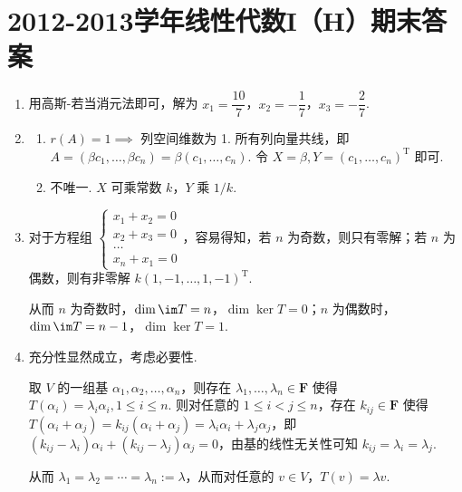 \section{2012-2013学年线性代数I（H）期末答案}

\begin{enumerate}
    \item 用高斯-若当消元法即可，解为 $x_1=\dfrac{10}{7}$，$x_2=-\dfrac{1}{7}$，$x_3=-\dfrac{2}{7}$.

    \item
    \begin{enumerate}
        \item $r(A)=1 \implies$ 列空间维数为 1. 所有列向量共线，即 $A = (\beta c_1, \dots, \beta c_n) = \beta (c_1, \dots, c_n)$. 令 $X=\beta, Y=(c_1, \dots, c_n)^\mathrm{T}$ 即可.
        \item 不唯一. $X$ 可乘常数 $k$，$Y$ 乘 $1/k$.
    \end{enumerate}

    \item 对于方程组 $\begin{cases}
        x_1 + x_2 = 0 \\
        x_2 + x_3 = 0 \\
        \ldots \\
        x_n + x_1 = 0
    \end{cases}$，容易得知，若 $n$ 为奇数，则只有零解；若 $n$ 为偶数，则有非零解 $k(1, -1, \ldots, 1, -1)^\mathrm{T}$.

    从而 $n$ 为奇数时，$\dim \im T = n$，$\dim \ker T = 0$；$n$ 为偶数时，$\dim \im T = n-1$，$\dim \ker T = 1$.

    \item 充分性显然成立，考虑必要性.

    取 $V$ 的一组基 $\alpha_1, \alpha_2, \ldots, \alpha_n$，则存在 $\lambda_1, \ldots, \lambda_n \in \mathbf{F}$ 使得 $T(\alpha_i) = \lambda_i \alpha_i, 1\leqslant i \leqslant n$. 则对任意的 $1 \leqslant i < j \leqslant n$，存在 $k_{ij} \in \mathbf{F}$ 使得 $T(\alpha_i + \alpha_j) = k_{ij}(\alpha_i + \alpha_j) = \lambda_i \alpha_i + \lambda_j \alpha_j$，即 $(k_{ij} - \lambda_i) \alpha_i + (k_{ij} - \lambda_j) \alpha_j = 0$，由基的线性无关性可知 $k_{ij} = \lambda_i = \lambda_j$.

    从而 $\lambda_1 = \lambda_2 = \cdots = \lambda_n := \lambda$，从而对任意的 $v \in V$，$T(v) = \lambda v$.


\end{enumerate}
